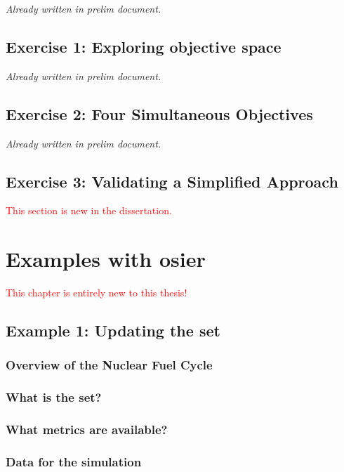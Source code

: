 \textit{Already written in prelim document.}

\section{Exercise 1: Exploring objective space}

\textit{Already written in prelim document.}

\section{Exercise 2: Four Simultaneous Objectives}

\textit{Already written in prelim document.}

\section{Exercise 3: Validating a Simplified Approach}

\textcolor{red}{This section is new in the dissertation.}

\chapter{Examples with \acs{osier}}
\label{chapter:examples}

\textcolor{red}{This chapter is entirely new to this thesis!}

\section{Example 1: Updating the \ac{set}}

\subsection{Overview of the Nuclear Fuel Cycle}

\subsection{What is the \ac{set}?}

\subsection{What metrics are available?}

\subsection{Data for the simulation}

